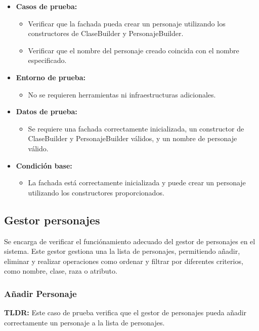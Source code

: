 \documentclass{article}
\begin{document}
\begin{itemize}
	\item \textbf{Casos de prueba:}
	\begin{itemize}
		\item Verificar que la fachada pueda crear un personaje utilizando los constructores de ClaseBuilder y PersonajeBuilder.
		\item Verificar que el nombre del personaje creado coincida con el nombre especificado.
	\end{itemize}
	
	\item \textbf{Entorno de prueba:}
	\begin{itemize}
		\item No se requieren herramientas ni infraestructuras adicionales.
	\end{itemize}
	
	\item \textbf{Datos de prueba:}
	\begin{itemize}
		\item Se requiere una fachada correctamente inicializada, un constructor de ClaseBuilder y PersonajeBuilder válidos, y un nombre de personaje válido.
	\end{itemize}
	
	\item \textbf{Condición base:}
	\begin{itemize}
		\item La fachada está correctamente inicializada y puede crear un personaje utilizando los constructores proporcionados.
	\end{itemize}
\end{itemize}

\subsection{Gestor personajes}
Se encarga de verificar el funciónamiento adecuado del gestor de personajes en el sistema. Este gestor gestiona una la lista de personajes, permitiendo añadir, eliminar y realizar operaciones como ordenar y filtrar por diferentes criterios, como nombre, clase, raza o atributo.

\subsubsection{Añadir Personaje}
\textbf{TLDR:} Este caso de prueba verifica que el gestor de personajes pueda añadir correctamente un personaje a la lista de personajes.
\end{document}
